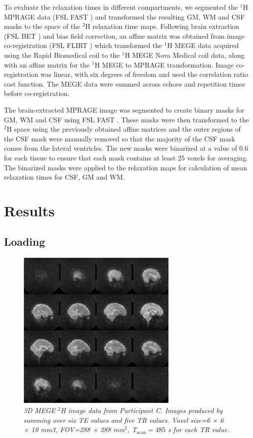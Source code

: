 \documentclass[class=article, crop=false]{standalone}
\begin{document}
To evaluate the relaxation times in different compartments, we segmented the $^1$H MPRAGE data (FSL FAST \cite{Zhang2001SegmentationAlgorithm}) and transformed the resulting GM, WM and CSF masks to the space of the $^2$H relaxation time maps. Following brain extraction (FSL BET \cite{Smith2002FastExtraction}) and bias field correction, an affine matrix was obtained from image co-registration (FSL FLIRT \cite{Jenkinson2001AImages,Jenkinson2002ImprovedImages}) which transformed the $^1$H MEGE data acquired using the Rapid Biomedical coil to the $^1$H MEGE Nova Medical coil data, along with an affine matrix for the $^1$H MEGE to MPRAGE transformation. Image co-registration was linear, with six degrees of freedom and used the correlation ratio cost function. The MEGE data were summed across echoes and repetition times before co-registration.

The brain-extracted MPRAGE image was segmented to create binary masks for GM, WM and CSF using FSL FAST \cite{Zhang2001SegmentationAlgorithm}. These masks were then transformed to the $^2$H space using the previously obtained affine matrices and the outer regions of the CSF mask were manually removed so that the majority of the CSF mask comes from the lateral ventricles. The new masks were binarized at a value of 0.6 for each tissue to ensure that each mask contains at least 25 voxels for averaging. The binarized masks were applied to the relaxation maps for calculation of mean relaxation times for CSF, GM and WM.

\section{Results}
\subsection{Loading}

\begin{figure}[H]
    \centering
    \includegraphics[width=0.7\textwidth]{Figures/D2O/Sag_Full.png}
    \caption{\textit{3D MEGE $^2$H image data from Participant C. Images produced by summing over six TE values and five TR values. Voxel size=6 × 6 × 10 mm3, FOV=288 × 288 mm$^2$, T$_\textrm{scan}=485$ s for each TR value.}}
    \label{fig:D2O:Sag_Full}
\end{figure}
\end{document}
